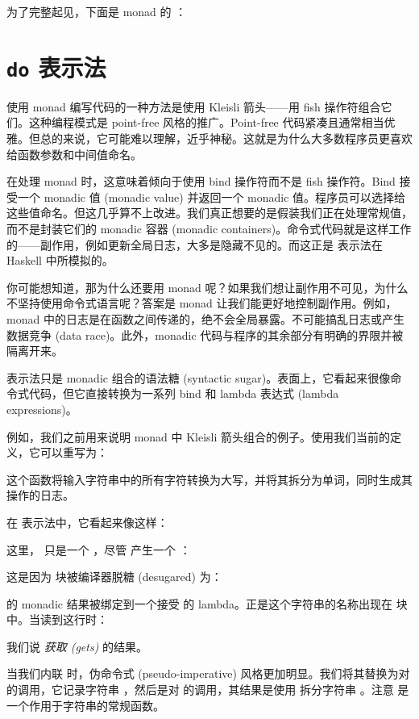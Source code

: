 为了完整起见，下面是  monad 的 ：


\section{\texttt{do} 表示法}

使用 monad 编写代码的一种方法是使用 Kleisli 箭头——用 fish 操作符组合它们。这种编程模式是 point-free 风格的推广。Point-free 代码紧凑且通常相当优雅。但总的来说，它可能难以理解，近乎神秘。这就是为什么大多数程序员更喜欢给函数参数和中间值命名。

在处理 monad 时，这意味着倾向于使用 bind 操作符而不是 fish 操作符。Bind 接受一个 monadic 值 (monadic value) 并返回一个 monadic 值。程序员可以选择给这些值命名。但这几乎算不上改进。我们真正想要的是假装我们正在处理常规值，而不是封装它们的 monadic 容器 (monadic containers)。命令式代码就是这样工作的——副作用，例如更新全局日志，大多是隐藏不见的。而这正是  表示法在 Haskell 中所模拟的。

你可能想知道，那为什么还要用 monad 呢？如果我们想让副作用不可见，为什么不坚持使用命令式语言呢？答案是 monad 让我们能更好地控制副作用。例如， monad 中的日志是在函数之间传递的，绝不会全局暴露。不可能搞乱日志或产生数据竞争 (data race)。此外，monadic 代码与程序的其余部分有明确的界限并被隔离开来。

 表示法只是 monadic 组合的语法糖 (syntactic sugar)。表面上，它看起来很像命令式代码，但它直接转换为一系列 bind 和 lambda 表达式 (lambda expressions)。

例如，我们之前用来说明  monad 中 Kleisli 箭头组合的例子。使用我们当前的定义，它可以重写为：

这个函数将输入字符串中的所有字符转换为大写，并将其拆分为单词，同时生成其操作的日志。

在  表示法中，它看起来像这样：

这里， 只是一个 ，尽管  产生一个 ：

这是因为  块被编译器脱糖 (desugared) 为：

 的 monadic 结果被绑定到一个接受  的 lambda。正是这个字符串的名称出现在  块中。当读到这行时：

我们说  \emph{获取 (gets)}  的结果。

当我们内联  时，伪命令式 (pseudo-imperative) 风格更加明显。我们将其替换为对  的调用，它记录字符串 ，然后是对  的调用，其结果是使用  拆分字符串 。注意  是一个作用于字符串的常规函数。

